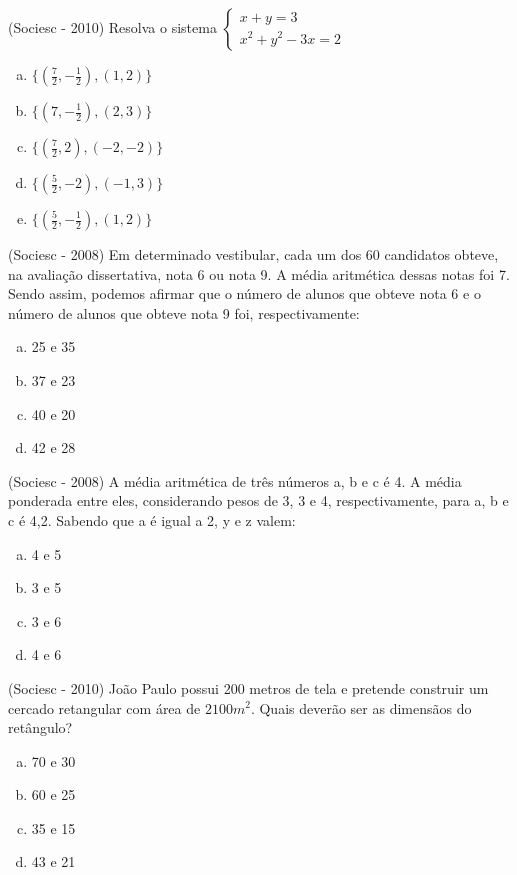  \begin{exer}
 (Sociesc - 2010) Resolva o sistema
  $\begin{cases}
    x+y= 3 \\
    x^2+ y^2 -3x=2
   \end{cases}$
  \begin{enumerate}[a)]
  \item $\{(\frac{7}{2}, -\frac{1}{2}), (1,2)\}$
  \item $\{(7, -\frac{1}{2}), (2,3)\}$
  \item $\{(\frac{7}{2}, 2), (-2,-2)\}$
  \item $\{(\frac{5}{2}, -2), (-1,3)\}$
  \item $\{(\frac{5}{2}, -\frac{1}{2}), (1,2)\}$
 \end{enumerate}
 \end{exer}

 \begin{exer}
 (Sociesc - 2008) Em determinado vestibular, cada um dos 60 candidatos obteve, na avaliação dissertativa, nota 6 ou nota 9. A média aritmética dessas notas foi 7. Sendo assim, podemos afirmar que o número de alunos que obteve nota 6 e o número de alunos que obteve nota 9 foi, respectivamente:
  \begin{enumerate}[a)]
  \item 25 e 35
  \item 37 e 23
  \item 40 e 20
  \item 42 e 28
 \end{enumerate}
 \end{exer}

 \begin{exer}
 (Sociesc - 2008) A média aritmética de três números a, b e c é 4. A média ponderada entre eles, considerando pesos de 3, 3 e 4, respectivamente, para a, b e c é 4,2. Sabendo que a é igual a 2, y e z valem:
  \begin{enumerate}[a)]
  \item 4 e 5
  \item 3 e 5
  \item 3 e 6
  \item 4 e 6
 \end{enumerate}
 \end{exer}

\begin{exer}
 (Sociesc - 2010) João Paulo possui 200 metros de tela e pretende construir um cercado retangular com área de $2100 m^2$. Quais deverão ser as dimensãos do retângulo?
  \begin{enumerate}[a)]
  \item 70 e 30
  \item 60 e 25
  \item 35 e 15
  \item 43 e 21
 \end{enumerate}
 \end{exer}

